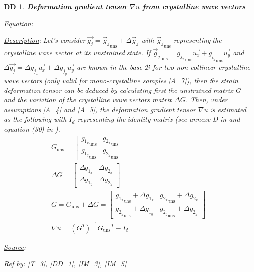 \documentclass[12pt]{article}
\newtheorem{DD}{DD}
\begin{document}
\begin{DD}
\label{DD_3}
\noindent\colorbox{shadecolorDD}{\normalfont \textbf{Deformation gradient tensor 
$\nabla u$ from crystalline wave vectors}}
\normalfont
\item \underline{Equation}: 
\item \underline{Description}: Let's consider $\overrightarrow{g_j} = 
{\overrightarrow{g}_{j}}_{\text{uns}} + \Delta \overrightarrow{g}_j$ with 
${\overrightarrow{g}_{j}}_{\text{uns}}$ representing the crystalline wave vector 
at its unstrained state. If 
${\overrightarrow{g}_{j}}_{\text{uns}}={g_{j_{x}}}_{\text{uns}}\overrightarrow{u_{x}}+{g_{j_{y}}}_{\text{uns}}\overrightarrow{u_{y}}$ 
and $\Delta \overrightarrow{g_{j}}=\Delta g_{j_{x}}\overrightarrow{u_{x}}+\Delta 
g_{j_{y}}\overrightarrow{u_{y}}$ are known in the base $\mathcal{B}$ for two 
non-collinear crystalline wave vectors (only valid for mono-crystalline samples 
\cref{A_7}), then the strain deformation tensor can be deduced by calculating 
first the unstrained matrix $G$ and the variation of the crystalline wave 
vectors matrix $\Delta G$. Then, under assumptions \cref{A_4} and \cref{A_5}, 
the deformation gradient tensor $\nabla u$ is estimated as the following with 
$I_{d}$ representing the identity matrix (see annexe D in \cite{Hytch1998} and 
equation (30) in \cite{Rouviere2005}). 
\begin{equation}
\begin{gathered}
	G_{\text{uns}} =
	\begin{bmatrix}
	{g_{1_{x}}}_{\text{uns}} & {g_{2_{x}}}_{\text{uns}} \\
	{g_{1_{y}}}_{\text{uns}} & {g_{2_{y}}}_{\text{uns}} 
	\end{bmatrix} \\
	\Delta G =
	\begin{bmatrix}
	\Delta g_{1_{x}} & \Delta g_{2_{x}} \\
	\Delta g_{1_{y}} & \Delta g_{2_{y}} 
	\end{bmatrix} \\
	G = G_{\text{uns}} + \Delta G = 
	\begin{bmatrix}
	{g_{1_{x}}}_{\text{uns}}+\Delta g_{1_{x}} & {g_{2_{x}}}_{\text{uns}} + \Delta 
g_{2_{x}} \\
	{g_{2_{y}}}_{\text{uns}}+\Delta g_{1_{y}} & {g_{2_{y}}}_{\text{uns}} + \Delta 
g_{2_{y}} 
	\end{bmatrix}\\
	\nabla u = ({G}^{T})^{-1}{G_{\text{uns}}}^{T}-I_{d}
\end{gathered}
\label{eq:strain_1}
\end{equation}
\item \underline{Source}: \cite{Hytch1998,Rouviere2005}
\item \underline{Ref by}: \cref{T_3}, \cref{DD_1}, \cref{IM_3}, \cref{IM_5}
\end{DD}
\end{document}
